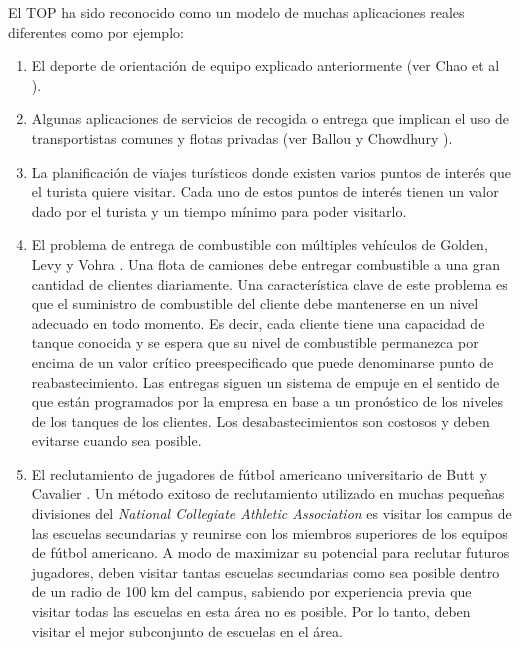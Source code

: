 \bigskip

El TOP ha sido reconocido como un modelo de muchas aplicaciones reales diferentes como por ejemplo:

\begin{enumerate}[i]

\item

El deporte de orientación de equipo explicado anteriormente (ver Chao et al \cite{ChaoGoldenWasil}). 

\item

Algunas aplicaciones de servicios de recogida o entrega que implican el uso de transportistas comunes y flotas privadas (ver Ballou y Chowdhury \cite{BallouChowdhury}). 

\item

La planificación de viajes turísticos donde existen varios puntos de interés que el turista quiere visitar. Cada uno de estos puntos de interés tienen un valor dado por el turista y un tiempo mínimo para poder visitarlo.

\item

El problema de entrega de combustible con múltiples vehículos de Golden, Levy y Vohra \cite{GoldenLevyVohra}. Una flota de camiones debe entregar combustible a una gran cantidad de clientes diariamente. Una característica clave de este problema es que el suministro de combustible del cliente debe mantenerse en un nivel adecuado en todo momento. Es decir, cada cliente tiene una capacidad de tanque conocida y se espera que su nivel de combustible permanezca por encima de un valor crítico preespecificado que puede denominarse punto de reabastecimiento. Las entregas siguen un sistema de empuje en el sentido de que están programados por la empresa en base a un pronóstico de los niveles de los tanques de los clientes. Los desabastecimientos son costosos y deben evitarse cuando sea posible.

\item

El reclutamiento de jugadores de fútbol americano universitario de Butt y Cavalier \cite{ButtCavalier}. Un método exitoso de reclutamiento utilizado en muchas pequeñas divisiones del \textit{National Collegiate Athletic Association} es visitar los campus de las escuelas secundarias y reunirse con los miembros superiores de los equipos de fútbol americano. A modo de maximizar su potencial para reclutar futuros jugadores, deben visitar tantas escuelas secundarias como sea posible dentro de un radio de 100 km del campus, sabiendo por experiencia previa que visitar todas las escuelas en esta área no es posible. Por lo tanto, deben visitar el mejor subconjunto de escuelas en el área.


\end{enumerate}
